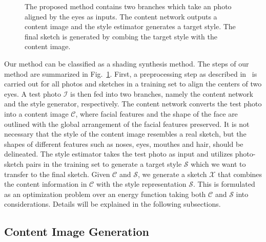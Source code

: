 \documentclass[10pt,twocolumn,letterpaper]{article}
\begin{document}
\begin{figure}[t]
\centering
{}
\caption{The proposed method contains two branches which take an photo aligned by the eyes as inputs. The content network outputs a content image and the style estimator generates a target style. The final sketch is generated by combing the target style with the content image.}
\label{fig:overview}
\end{figure}
Our method can be classified as a shading synthesis method. The steps of our method are summarized in Fig.~\ref{fig:overview}. First, a preprocessing step as described in~\cite{wang2009face} is carried out for all photos and sketches in a training set to align the centers of two eyes. A test photo $\mathcal{I}$ is then fed into two branches, namely the content network and the style generator, respectively. The content network converts the test photo into a content image $\mathcal{C}$, where facial features and the shape of the face are outlined with the global arrangement of the facial features preserved. It is not necessary that the style of the content image resembles a real sketch, but the shapes of different features such as noses, eyes, mouthes and hair, should be delineated. The style estimator takes the test photo as input and utilizes photo-sketch pairs in the training set to generate a target style $\mathcal{S}$ which we want to transfer to the final sketch. Given $\mathcal{C}$ and $\mathcal{S}$, we generate a sketch $\mathcal{X}$ that combines the content information in $\mathcal{C}$ with the style representation $\mathcal{S}$. This is formulated as an optimization problem over an energy function taking both $\mathcal{C}$ and $\mathcal{S}$ into considerations. Details will be explained in the following subsections.

\subsection{Content Image Generation}
\end{document}
